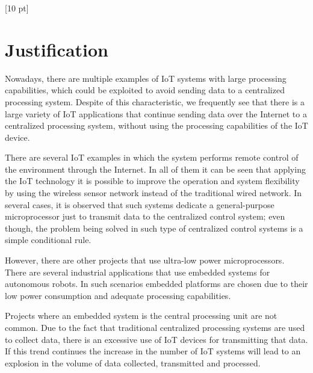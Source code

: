 \titleformat{\chapter}{\Huge\bfseries}{\thechapter}{0 pt}{\rule{340 pt}{3 pt}\\}
\titlespacing{\chapter}{100 pt}{-25 pt}{40 pt}[10 pt]	
\pagestyle{fancy}
\fancyhead[RO,RE]{\thepage}
\fancyfoot[CO,CE]{}

\chapter*{Justification}

\normalsize
\noindent

Nowadays, there are multiple examples of IoT systems with large processing
capabilities, which could be exploited to avoid sending data to a centralized
processing system. Despite of this characteristic, we frequently see that there
is a large variety of IoT applications that continue sending data over the
Internet to a centralized processing system, without using the processing
capabilities of the IoT device.

There are several IoT examples in which the system performs remote control of
the environment through the Internet. In all of them it can be seen that
applying the IoT technology it is possible to improve the operation and system
flexibility by using the wireless sensor network instead of the traditional
wired network. In several cases, it is observed that such systems dedicate a
general-purpose microprocessor just to transmit data to the centralized control
system; even though, the problem being solved in such type of centralized
control systems is a simple conditional rule.

However, there are other projects that use ultra-low power microprocessors.
There are several industrial applications that use embedded systems for
autonomous robots. In such scenarios embedded platforms are chosen due to their
low power consumption and adequate processing capabilities. 

Projects where an embedded system is the central processing unit are not
common. Due to the fact that traditional centralized processing systems are
used to collect data, there is an excessive use of IoT devices for transmitting
that data. If this trend continues the increase in the number of IoT systems
will lead to an explosion in the volume of data collected, transmitted and
processed.

